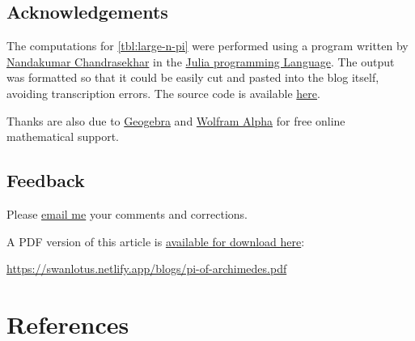\documentclass[
  a4paper,
]{article}
\begin{document}
\subsection{Acknowledgements}\label{acknowledgements}

The computations for \cref{tbl:large-n-pi} were performed using a
program written by
\href{https://www.linkedin.com/in/nandakumar-chandrasekhar-a400b45b/}{Nandakumar
Chandrasekhar} in the \href{https://julialang.org/}{Julia programming
Language}. The output was formatted so that it could be easily cut and
pasted into the blog itself, avoiding transcription errors. The source
code is available \href{auxiliary/pi_approximations.jl}{here}.

Thanks are also due to \href{https://www.geogebra.org/}{Geogebra} and
\href{https://www.wolframalpha.com/}{Wolfram Alpha} for free online
mathematical support.

\subsection{Feedback}\label{feedback}

Please \href{mailto:feedback.swanlotus@gmail.com}{email me} your
comments and corrections.

\noindent A PDF version of this article is
\href{./pi-of-archimedes.pdf}{available for download here}:

\href{https://swanlotus.netlify.app/blogs/pi-of-archimedes.pdf}{\textsf{https://swanlotus.netlify.app/blogs/pi-of-archimedes.pdf}}

\section*{References}\label{bibliography}
\end{document}
